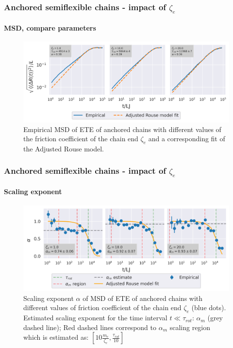 \documentclass[handout]{beamer}
\begin{document}
\begin{frame}
    \frametitle{Anchored semiflexible chains - impact of $\zeta_e$}
    \framesubtitle{MSD, compare parameters}
    \begin{figure}[h]
        \includegraphics[width=\textwidth]{14+15+16-exp-msd-log-arm_fit-log.png}
        \caption{Empirical MSD of ETE of anchored chains with different values of
        the friction coefficient of the chain end $\zeta_e$ and a corresponding fit
        of the Adjusted Rouse model.
        }
    \end{figure}
\end{frame}


\begin{frame}
    \frametitle{Anchored semiflexible chains - impact of $\zeta_e$}
    \framesubtitle{Scaling exponent}
    \begin{figure}[h]
        \includegraphics[width=\textwidth]{14+15+16-exp-alpha.png}
        \caption{Scaling exponent $\alpha$ of MSD of ETE 
        of anchored chains with different values of
        friction coefficient of the chain end $\zeta_e$ (blue dots).
        Estimated scaling exponent for the time interval
        $t \ll \tau_{rot}$: $\alpha_m$ (grey dashed line); Red dashed lines
        correspond to $\alpha_m$ scaling region which is estimated as:
        $[10 \frac{m_e}{\zeta_e}, \frac{\tau_{rot}}{10}]$
        }
    \end{figure}
\end{frame}
\end{document}
